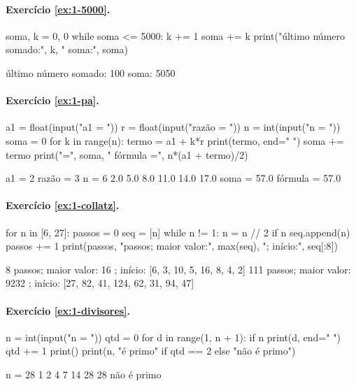 \paragraph{Exercício \ref{ex:1-5000}.}
\begin{entrada}
soma, k = 0, 0
while soma <= 5000:
    k += 1
    soma += k
print("último número somado:", k, "  soma:", soma)
\end{entrada}
\begin{saida}
último número somado: 100   soma: 5050
\end{saida}

\paragraph{Exercício \ref{ex:1-pa}.}
\begin{entrada}
a1 = float(input("a1 = "))
r = float(input("razão = "))
n = int(input("n = "))
soma = 0
for k in range(n):
    termo = a1 + k*r
    print(termo, end=" ")
    soma += termo
print("\nsoma =", soma, "  fórmula =", n*(a1 + termo)/2)
\end{entrada}
\begin{saida}
a1 = 2
razão = 3
n = 6
2.0 5.0 8.0 11.0 14.0 17.0
soma = 57.0   fórmula = 57.0
\end{saida}

\paragraph{Exercício \ref{ex:1-collatz}.}
\begin{entrada}
for n in [6, 27]:
    passos = 0
    seq = [n]
    while n != 1:
        n = n // 2 if n %
        seq.append(n)
        passos += 1
    print(passos, "passos; maior valor:", max(seq), "; início:", seq[:8])
\end{entrada}
\begin{saida}
8 passos; maior valor: 16 ; início: [6, 3, 10, 5, 16, 8, 4, 2]
111 passos; maior valor: 9232 ; início: [27, 82, 41, 124, 62, 31, 94, 47]
\end{saida}

\paragraph{Exercício \ref{ex:1-divisores}.}
\begin{entrada}
n = int(input("n = "))
qtd = 0
for d in range(1, n + 1):
    if n %
        print(d, end=" ")
        qtd += 1
print()
print(n, "é primo" if qtd == 2 else "não é primo")
\end{entrada}
\begin{saida}
n = 28
1 2 4 7 14 28
28 não é primo
\end{saida}

